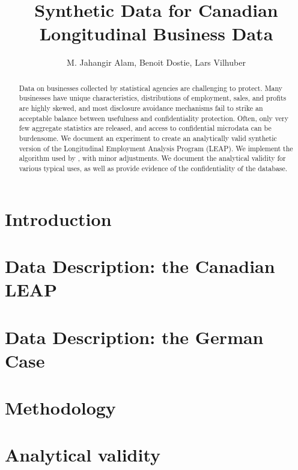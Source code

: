 \documentclass{article}
\title{Synthetic Data for Canadian Longitudinal Business Data }
\author{M. Jahangir Alam, Benoit Dostie, Lars Vilhuber}
\begin{document}
\maketitle
{}
\begin{abstract}
\noindent
Data on businesses collected by statistical agencies are challenging to protect. Many businesses have unique characteristics, distributions of employment, sales, and profits are highly skewed, and  most disclosure avoidance mechanisms  fail to strike an acceptable balance between usefulness and confidentiality protection. Often, only very few aggregate statistics are released, and access to confidential microdata can be burdensome. We document an experiment to create an analytically valid synthetic version of the Longitudinal Employment Analysis Program (LEAP). We implement the algorithm used by \citet{RePEc:bla:istatr:v:79:y:2011:i:3:p:362-384}, with minor adjustments. We document the analytical validity for various typical uses, as well as provide evidence of the  confidentiality of the database.


\end{abstract}
\newpage
\tableofcontents
\newpage
\section{Introduction}


\section{Data Description: the Canadian LEAP}


\section{Data Description: the German Case}
%

\section{Methodology}


\section{Analytical validity}

\newcommand{\TableNote}{$LEAP$ is the Longitudinal Employment Analysis Program and $CanSynLBD$ is the Canadian synthetic database based on LEAP. Here, we use the 2015 vintage of LEAP and drop the last year observations.}
\end{document}
